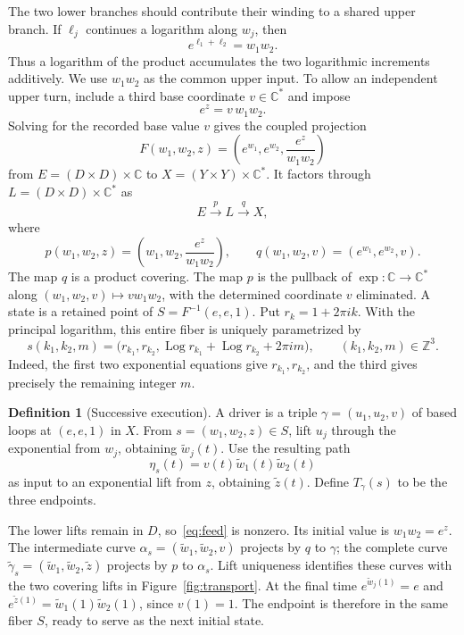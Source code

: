 \documentclass[11pt]{article}
\theoremstyle{definition}
\newtheorem{definition}{Definition}[section]
\theoremstyle{plain}
\newcommand{\C}{\mathbb C}
\newcommand{\Z}{\mathbb Z}
\newcommand{\Log}{\operatorname{Log}}
\newcommand{\state}[3]{s(#1,#2,#3)}
\begin{document}
The two lower branches should contribute their winding to a shared
upper branch. If $\ell_j$ continues a logarithm along $w_j$, then
\[
 e^{\ell_1+\ell_2}=w_1w_2.
\]
Thus a logarithm of the product accumulates the two logarithmic
increments additively. We use $w_1w_2$ as the common upper input.
To allow an independent upper turn, include a third base coordinate
$v\in\C^*$ and impose
\[
 e^z=v\,w_1w_2.
\]
Solving for the recorded base value $v$ gives the coupled projection
\begin{equation}\label{eq:F}
 F(w_1,w_2,z)=\left(e^{w_1},e^{w_2},\frac{e^z}{w_1w_2}\right)
\end{equation}
from $E=(D\times D)\times\C$ to $X=(Y\times Y)\times\C^*$.
It factors through $L=(D\times D)\times\C^*$ as
\begin{equation}\label{eq:covers}
 E\xrightarrow{\ p\ }L\xrightarrow{\ q\ }X,
\end{equation}
where
\[
 p(w_1,w_2,z)=\left(w_1,w_2,\frac{e^z}{w_1w_2}\right),
 \qquad q(w_1,w_2,v)=(e^{w_1},e^{w_2},v).
\]
The map $q$ is a product covering. The map $p$ is the pullback of
$\exp:\C\to\C^*$ along $(w_1,w_2,v)\mapsto vw_1w_2$, with the
determined coordinate $v$ eliminated.
A state is a retained point of $S=F^{-1}(e,e,1)$.
Put $r_k=1+2\pi ik$. With the principal logarithm, this entire
fiber is uniquely parametrized by
\begin{equation}\label{eq:state}
 \state{k_1}{k_2}{m}
 =\bigl(r_{k_1},r_{k_2},
 \Log r_{k_1}+\Log r_{k_2}+2\pi im\bigr),
 \qquad (k_1,k_2,m)\in\Z^3.
\end{equation}
Indeed, the first two exponential equations give $r_{k_1},r_{k_2}$,
and the third gives precisely the remaining integer $m$.

\begin{definition}[Successive execution]\label{def:execution}
A driver is a triple $\gamma=(u_1,u_2,v)$ of based loops at
$(e,e,1)$ in $X$. From $s=(w_1,w_2,z)\in S$, lift $u_j$ through
the exponential from $w_j$, obtaining $\widetilde w_j(t)$.
Use the resulting path
\begin{equation}\label{eq:feed}
 \eta_s(t)=v(t)\widetilde w_1(t)\widetilde w_2(t)
\end{equation}
as input to an exponential lift from $z$, obtaining
$\widetilde z(t)$. Define $T_\gamma(s)$ to be the three endpoints.
\end{definition}

The lower lifts remain in $D$, so~\eqref{eq:feed} is nonzero.
Its initial value is $w_1w_2=e^z$.
The intermediate curve
$\alpha_s=(\widetilde w_1,\widetilde w_2,v)$ projects by $q$ to
$\gamma$; the complete curve
$\widetilde\gamma_s=(\widetilde w_1,\widetilde w_2,\widetilde z)$
projects by $p$ to $\alpha_s$. Lift uniqueness identifies these
curves with the two covering lifts in Figure~\ref{fig:transport}.
At the final time $e^{\widetilde w_j(1)}=e$ and
$e^{\widetilde z(1)}=\widetilde w_1(1)\widetilde w_2(1)$, since
$v(1)=1$. The endpoint is therefore in the same fiber $S$, ready
to serve as the next initial state.
\end{document}
